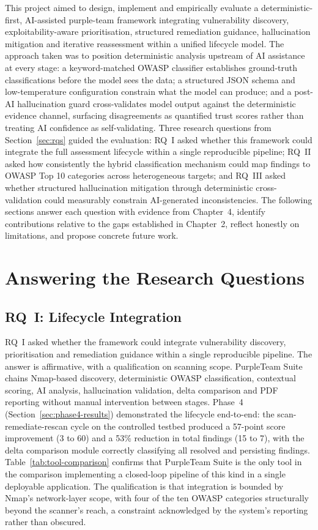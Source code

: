 \documentclass[12pt, a4paper, oneside]{report}
\begin{document}
This project aimed to design, implement and empirically evaluate a deterministic-first, AI-assisted purple-team framework integrating vulnerability discovery, exploitability-aware prioritisation, structured remediation guidance, hallucination mitigation and iterative reassessment within a unified lifecycle model. The approach taken was to position deterministic analysis upstream of AI assistance at every stage: a keyword-matched OWASP classifier establishes ground-truth classifications before the model sees the data; a structured JSON schema and low-temperature configuration constrain what the model can produce; and a post-AI hallucination guard cross-validates model output against the deterministic evidence channel, surfacing disagreements as quantified trust scores rather than treating AI confidence as self-validating. Three research questions from Section~\ref{sec:rqs} guided the evaluation: RQ~I asked whether this framework could integrate the full assessment lifecycle within a single reproducible pipeline; RQ~II asked how consistently the hybrid classification mechanism could map findings to OWASP Top 10 categories across heterogeneous targets; and RQ~III asked whether structured hallucination mitigation through deterministic cross-validation could measurably constrain AI-generated inconsistencies. The following sections answer each question with evidence from Chapter~4, identify contributions relative to the gaps established in Chapter~2, reflect honestly on limitations, and propose concrete future work.

\section{Answering the Research Questions}
\label{sec:ch5-rqs}

\subsection*{RQ~I: Lifecycle Integration}

RQ~I asked whether the framework could integrate vulnerability discovery, prioritisation and remediation guidance within a single reproducible pipeline. The answer is affirmative, with a qualification on scanning scope. PurpleTeam Suite chains Nmap-based discovery, deterministic OWASP classification, contextual scoring, AI analysis, hallucination validation, delta comparison and PDF reporting without manual intervention between stages. Phase~4 (Section~\ref{sec:phase4-results}) demonstrated the lifecycle end-to-end: the scan-remediate-rescan cycle on the controlled testbed produced a 57-point score improvement (3 to 60) and a 53\% reduction in total findings (15 to 7), with the delta comparison module correctly classifying all resolved and persisting findings. Table~\ref{tab:tool-comparison} confirms that PurpleTeam Suite is the only tool in the comparison implementing a closed-loop pipeline of this kind in a single deployable application. The qualification is that integration is bounded by Nmap's network-layer scope, with four of the ten OWASP categories structurally beyond the scanner's reach, a constraint acknowledged by the system's reporting rather than obscured.
\end{document}
